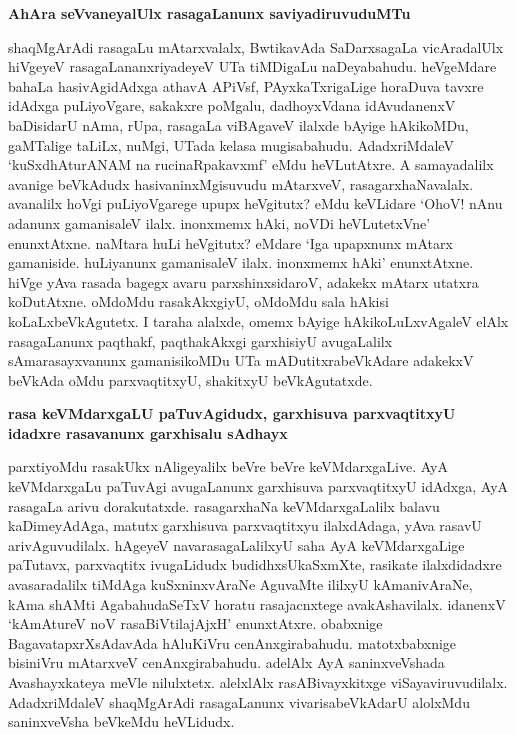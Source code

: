 {\bigskip
\noindent
{\large\bf AhAra seVvaneyalUlx rasagaLanunx saviyadiruvuduMTu}}\label{page221}
\medskip

\noindent
shaqMgArAdi rasagaLu mAtarxvalalx, BwtikavAda SaDarxsagaLa vicAradalUlx hiVgeyeV rasagaLananxriyade\-yeV UTa tiMDigaLu naDeyabahudu. heVgeMdare bahaLa hasi\-vAgidAdxga athavA APiVsf, PAyxkaTxrigaLige hora\-Duva tavxre idAdxga puLiyoVgare, sakakxre poMgalu, dadhoyxVdana idAvudanenxV baDisidarU nAma, rUpa, rasa\-gaLa viBAgaveV ilalxde bAyige hAkikoMDu, gaMTalige taLiLx, nuMgi, UTada kelasa mugisa\-bahudu. AdadxriMdaleV `kuSxdhAturANAM na rucinaRpakavxmf'\label{221} eMdu heVLu\-tAtxre. A samayadalilx avanige beVkAdudx hasivaninxMgisuvudu mAtarxveV, rasa\-garxhaNavalalx. avanalilx hoVgi puLiyoVgarege upupx heVgitutx? eMdu keVLidare `OhoV! nAnu adanunx gamanisaleV ilalx. inonxmemx hAki, noVDi heVLutetxVne' enunx\-tAtxne. naMtara huLi heVgitutx? eMdare `Iga upapxnunx mAtarx gamaniside. huLiyanunx gamanisaleV ilalx. inonxmemx hAki' enunxtAtxne. hiVge yAva rasada bagegx avaru parxshinxsidaroV, adakekx mAtarx utatxra koDu\-tAtxne. oMdoMdu rasakAkxgiyU, oMdoMdu sala hAkisi koLaLxbeVkAgutetx. I taraha alalxde, omemx bAyige hAkikoLuLxvAgaleV elAlx rasagaLanunx paqthakf, paqthakAkxgi garxhisiyU avugaLalilx sAmarasayxvanunx gamanisikoMDu UTa mADutitxrabeVkAdare adakekxV beVkAda oMdu parxvaqtitxyU, shakitxyU beVkAgutatxde.

{\bigskip
\noindent
{\large\bf rasa keVMdarxgaLU paTuvAgidudx, garxhisuva parxvaqtitxyU idadxre rasavanunx garxhisalu sAdhayx}}\label{page222}
\medskip

\noindent
parxtiyoMdu rasakUkx nAligeyalilx beVre beVre keVMdarxgaLive. AyA keVMdarxgaLu paTuvAgi avu\-gaLanunx garxhisuva parxvaqtitxyU idAdxga, AyA rasagaLa arivu dora\-kutatxde. rasagarxhaNa keVMdarxgaLalilx balavu kaDimeyAdAga, matutx garxhisuva parxvaqtitxyu ilalxdAdaga, yAva rasavU arivAguvudilalx. hAgeyeV navarasagaLalilxyU saha AyA keVMdarxgaLige paTutavx, parxvaqtitx ivugaLidudx budidhxsUkaSxmXte, rasikate ilalx\-didadxre avasaradalilx tiMdAga kuSxninxvAraNe AguvaMte ililxyU kAmanivAraNe, kAma shAMti Agabahu\-daSeTxV horatu rasajacnxtege avakAshavilalx. idanenxV `kAmAtureV noV rasaBiVtilajAjxH'\label{222} enunxtAtxre. obabxnige BagavatapxrXsAdavAda hAluKiVru cenAnxgirabahudu. matotxbabxnige bisiniVru mAtarxveV cenAnxgira\-bahudu. adelAlx AyA saninxveVshada Avashayxkateya meVle nilulxtetx. alelxlAlx rasABivayxkitxge viSayaviruvudilalx. Adadx\-riMdaleV shaqMgArAdi rasagaLanunx vivarisabeVkAdarU alolxMdu saninxveVsha beVkeMdu heVLidudx.

